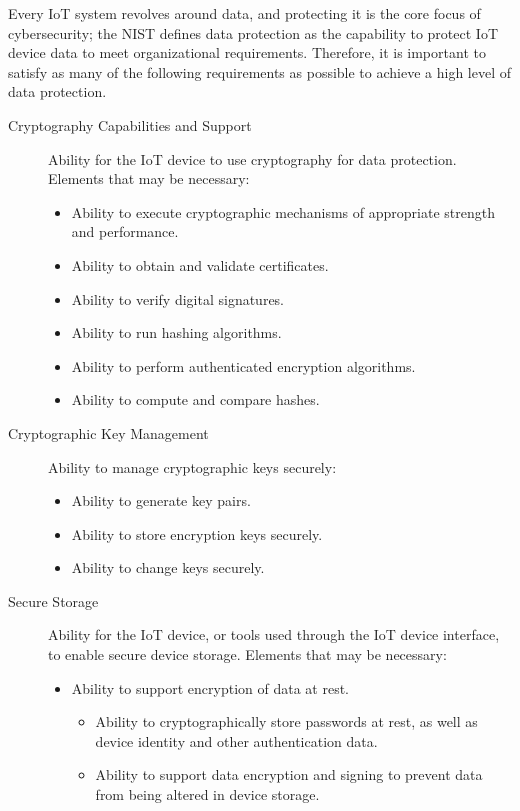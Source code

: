 Every IoT system revolves around data, and protecting it is the core focus of cybersecurity; the NIST defines data protection as the capability to protect IoT device data to meet organizational requirements. Therefore, it is important to satisfy as many of the following requirements as possible to achieve a high level of data protection.

\begin{description}
    \item[Cryptography Capabilities and Support] Ability for the IoT device to use cryptography for data protection. Elements that may be necessary:
        \begin{itemize}
            \item Ability to execute cryptographic mechanisms of appropriate strength and performance.
            \item Ability to obtain and validate certificates.
            \item Ability to verify digital signatures.
            \item Ability to run hashing algorithms.
            \item Ability to perform authenticated encryption algorithms.
            \item Ability to compute and compare hashes.
        \end{itemize}
    \item[Cryptographic Key Management] Ability to manage cryptographic keys securely:
        \begin{itemize}
            \item Ability to generate key pairs.
            \item Ability to store encryption keys securely.
            \item Ability to change keys securely.
        \end{itemize}
    \item[Secure Storage] Ability for the IoT device, or tools used through the IoT device interface, to enable secure device storage. Elements that may be necessary:
        \begin{itemize}
            \item Ability to support encryption of data at rest.
            \begin{itemize}
                \item Ability to cryptographically store passwords at rest, as well as device identity and other authentication data.
                \item Ability to support data encryption and signing to prevent data from being altered in device storage.

\end{itemize}
\end{itemize}
\end{description}

